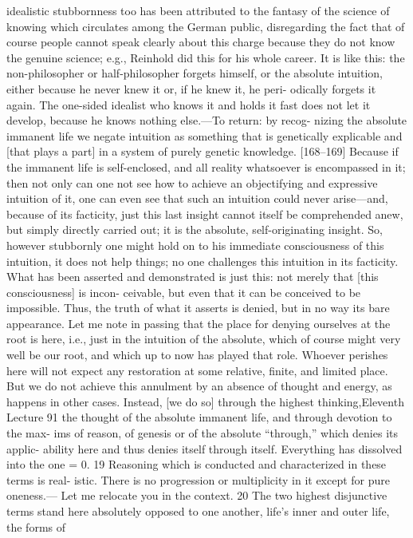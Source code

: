 idealistic stubbornness too has been attributed to the fantasy of the science of
knowing which circulates among the German public, disregarding the fact
that of course people cannot speak clearly about this charge because they do
not know the genuine science; e.g., Reinhold did this for his whole career. It
is like this: the non-philosopher or half-philosopher forgets himself, or the
absolute intuition, either because he never knew it or, if he knew it, he peri-
odically forgets it again. The one-sided idealist who knows it and holds it fast
does not let it develop, because he knows nothing else.—To return: by recog-
nizing the absolute immanent life we negate intuition as something that is
genetically explicable and [that plays a part] in a system of purely genetic
knowledge. [168–169] Because if the immanent life is self-enclosed, and all
reality whatsoever is encompassed in it; then not only can one not see how to
achieve an objectifying and expressive intuition of it, one can even see that
such an intuition could never arise—and, because of its facticity, just this last
insight cannot itself be comprehended anew, but simply directly carried out; it
is the absolute, self-originating insight. So, however stubbornly one might
hold on to his immediate consciousness of this intuition, it does not help
things; no one challenges this intuition in its facticity. What has been asserted
and demonstrated is just this: not merely that [this consciousness] is incon-
ceivable, but even that it can be conceived to be impossible. Thus, the truth of
what it asserts is denied, but in no way its bare appearance.
Let me note in passing that the place for denying ourselves at the root
is here, i.e., just in the intuition of the absolute, which of course might very
well be our root, and which up to now has played that role. Whoever perishes
here will not expect any restoration at some relative, finite, and limited place.
But we do not achieve this annulment by an absence of thought and energy,
as happens in other cases. Instead, [we do so] through the highest thinking,Eleventh Lecture
91
the thought of the absolute immanent life, and through devotion to the max-
ims of reason, of genesis or of the absolute “through,” which denies its applic-
ability here and thus denies itself through itself. Everything has dissolved into
the one = 0. 19
Reasoning which is conducted and characterized in these terms is real-
istic. There is no progression or multiplicity in it except for pure oneness.—
Let me relocate you in the context. 20 The two highest disjunctive terms stand
here absolutely opposed to one another, life’s inner and outer life, the forms of
